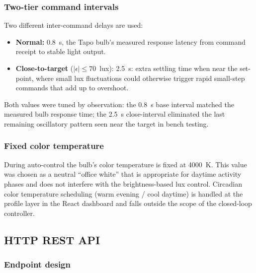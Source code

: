 \documentclass[12pt,letterpaper]{article}
\begin{document}
\subsubsection{Two-tier command intervals}

Two different inter-command delays are used:

\begin{itemize}
  \item \textbf{Normal:} 0.8~s, the Tapo bulb's measured response latency from
        command receipt to stable light output.
  \item \textbf{Close-to-target} ($|\epsilon| \leq 70$~lux): 2.5~s: extra
        settling time when near the set-point, where small lux fluctuations
        could otherwise trigger rapid small-step commands that add up to
        overshoot.
\end{itemize}

Both values were tuned by observation: the 0.8~s base interval matched the
measured bulb response time; the 2.5~s close-interval eliminated the last
remaining oscillatory pattern seen near the target in bench testing.

\subsubsection{Fixed color temperature}

During auto-control the bulb's color temperature is fixed at 4000~K. This
value was chosen as a neutral ``office white'' that is appropriate for
daytime activity phases and does not interfere with the brightness-based
lux control. Circadian color temperature scheduling (warm evening / cool
daytime) is handled at the profile layer in the React dashboard and falls
outside the scope of the closed-loop controller.

\subsection{HTTP REST API}

\subsubsection{Endpoint design}
\end{document}
